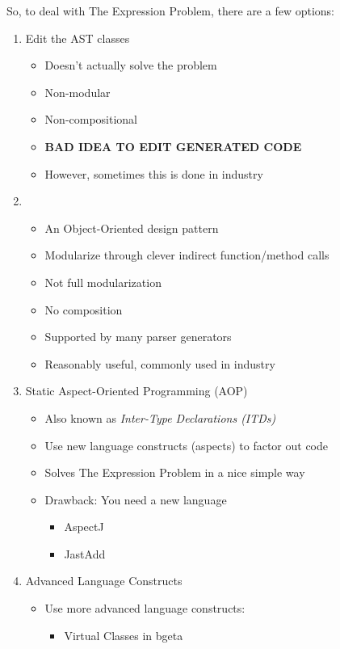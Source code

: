 So, to deal with The Expression Problem, there are a few options:
\begin{enumerate}[noitemsep]
\item Edit the AST classes
  \begin{itemize}[noitemsep]
  \item Doesn't actually solve the problem
  \item Non-modular
  \item Non-compositional
  \item \textbf{BAD IDEA TO EDIT GENERATED CODE}
  \item However, sometimes this is done in industry
  \end{itemize}
\item {}
  \begin{itemize}[noitemsep]
  \item An Object-Oriented design pattern
  \item Modularize through clever indirect function/method calls
  \item Not full modularization
  \item No composition
  \item Supported by many parser generators
  \item Reasonably useful, commonly used in industry
  \end{itemize}
\item Static Aspect-Oriented Programming (AOP)
  \begin{itemize}[noitemsep]
  \item Also known as \textit{Inter-Type Declarations (ITDs)}
  \item Use new language constructs (aspects) to factor out code
  \item Solves The Expression Problem in a nice simple way
  \item Drawback: You need a new language
    \begin{itemize}[noitemsep]
    \item AspectJ
    \item JastAdd
    \end{itemize}
  \end{itemize}
\item Advanced Language Constructs
  \begin{itemize}[noitemsep]
  \item Use more advanced language constructs:
    \begin{itemize}[noitemsep]
    \item Virtual Classes in bgeta

\end{itemize}
\end{itemize}
\end{enumerate}
